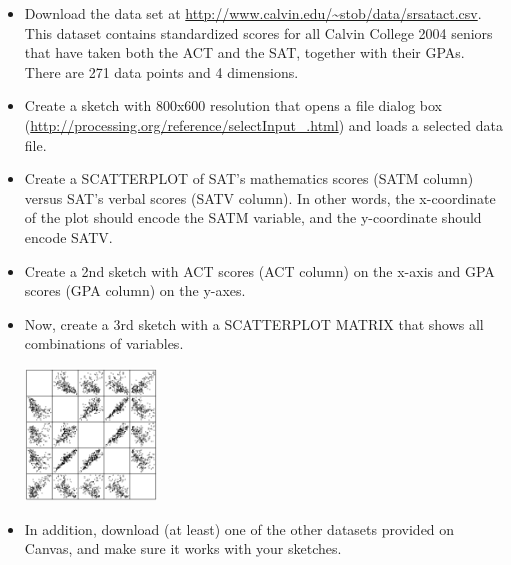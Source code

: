 \documentclass[a4paper,12pt]{article}
\begin{document}
\begin{itemize}

\item Download the data set at \url{
http://www.calvin.edu/~stob/data/srsatact.csv}. This dataset contains standardized scores for all Calvin College 2004 seniors that have taken both the ACT and the SAT, together with their GPAs. There are 271 data points and 4 dimensions. 

\item Create a sketch with 800x600 resolution that opens a file dialog box (\url{http://processing.org/reference/selectInput_.html}) and loads a selected data file. 

\item Create a SCATTERPLOT of SAT's mathematics scores (SATM column) versus SAT's verbal scores (SATV column). In other words, the x-coordinate of the plot should encode the SATM variable, and the y-coordinate should encode SATV. 

\begin{center}
\end{center}

\item Create a 2nd sketch with ACT scores (ACT column) on the x-axis and GPA scores (GPA column) on the y-axes.

\item Now, create a 3rd sketch with a SCATTERPLOT MATRIX that shows all combinations of variables.

\begin{center}
\includegraphics[width=3.5cm]{../images/splom.png}
\end{center}

\item In addition, download (at least) one of the other datasets provided on Canvas, and make sure it works with your sketches.


\end{itemize}
\end{document}
